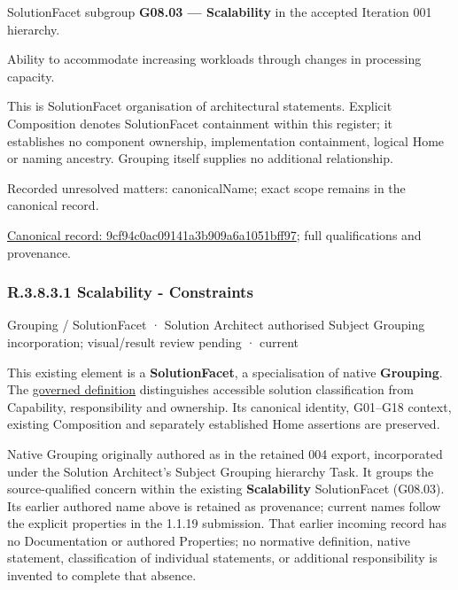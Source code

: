 SolutionFacet subgroup \textbf{G08.03 — Scalability} in the accepted Iteration 001 hierarchy.



Ability to accommodate increasing workloads through changes in processing capacity.



This is SolutionFacet organisation of architectural statements. Explicit Composition denotes SolutionFacet containment within this register; it establishes no component ownership, implementation containment, logical Home or naming ancestry. Grouping itself supplies no additional relationship.


{\small Recorded unresolved matters: canonicalName; exact scope remains in the canonical record.}\par
{\footnotesize \href{../../../../../../../continuum/grouping/9cf94c0ac09141a3b909a6a1051bff97.md}{Canonical record: 9cf94c0ac09141a3b909a6a1051bff97}; full qualifications and provenance.}\par
\subsubsection*{R.3.8.3.1 Scalability - Constraints}
\label{navigation:R.3.8.3.1}

\label{element:028a5b5f4b0e458a91489cac0513955d}
{\small Grouping / SolutionFacet · Solution Architect authorised Subject Grouping incorporation; visual/result review pending · current}\par

This existing element is a \textbf{SolutionFacet}, a specialisation of native
\textbf{Grouping}. The \href{\detokenize{../../../../../../../governance/continuum-representation.md#solutionfacet-classification--1119-candidate}}{governed definition}
distinguishes accessible solution classification from Capability, responsibility
and ownership. Its canonical identity, G01–G18 context, existing Composition
and separately established Home assertions are preserved.



Native Grouping originally authored as \texttt{} in the retained 004 export,
incorporated under the Solution Architect's Subject Grouping hierarchy Task.
It groups the source-qualified \texttt{} concern within
the existing \textbf{Scalability} SolutionFacet (G08.03). Its earlier authored name above is retained as provenance; current names
follow the explicit properties in the 1.1.19 submission.
That earlier incoming record has no Documentation or authored Properties; no normative
definition, native statement, classification of individual statements, or
additional responsibility is invented to complete that absence.



